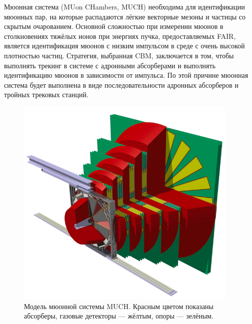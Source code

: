 \begin{minipage}[t]{0.495\textwidth}
Мюонная система (MUon CHambers, MUCH) необходима для идентификации мюонных пар, на которые распадаются лёгкие векторные мезоны и частицы со скрытым очарованием.
Основной сложностью при измерении мюонов в столкновениях тяжёлых ионов при энергиях пучка, предоставляемых FAIR, является идентификация мюонов с низким импульсом в среде с очень высокой плотностью частиц. Стратегия, выбранная CBM, заключается в том, чтобы выполнять трекинг в системе с адронными абсорберами и выполнять идентификацию мюонов в зависимости от импульса. По этой причине мюонная система будет выполнена в виде последовательности адронных абсорберов и тройных трековых станций. 
\end{minipage}
\begin{minipage}[t]{0.495\textwidth}
\begin{figure}[H]
\centering
\includegraphics[width=0.95\textwidth]{pictures/CBM_MUCH_model.png}
\caption{Модель мюонной системы MUCH. Красным цветом показаны абсорберы, газовые детекторы --- жёлтым, опоры --- зелёным.}
\label{fig:MUCH2}
\end{figure}
\end{minipage}

